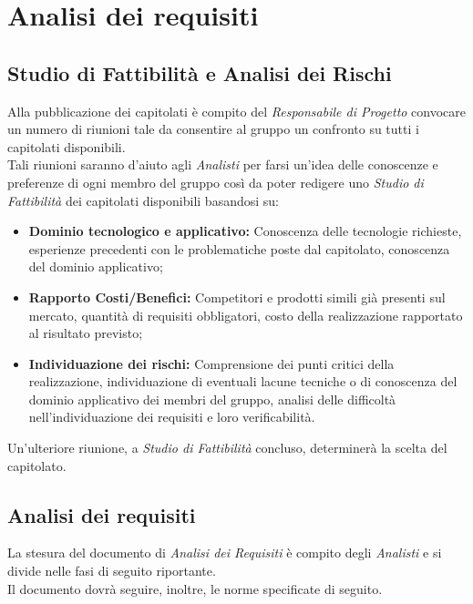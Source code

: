 \section{Analisi dei requisiti}
  \subsection{Studio di Fattibilità e Analisi dei Rischi}
    Alla pubblicazione dei capitolati è compito del \emph{Responsabile di Progetto} convocare un numero di riunioni tale da consentire
    al gruppo un confronto su tutti i capitolati disponibili.\\
    Tali riunioni saranno d'aiuto agli \emph{Analisti} per farsi un'idea delle conoscenze e preferenze di ogni membro del gruppo così da
    poter redigere uno \emph{Studio di Fattibilità} dei capitolati disponibili basandosi su:\\
    \begin{itemize}
      \item \textbf{Dominio tecnologico e applicativo: }Conoscenza delle tecnologie richieste, esperienze precedenti con le problematiche poste dal capitolato, conoscenza del
      dominio applicativo;
      \item \textbf{Rapporto Costi/Benefici: }Competitori e prodotti simili già presenti sul mercato, quantità di requisiti obbligatori, costo della realizzazione rapportato al
      risultato previsto;
      \item \textbf{Individuazione dei rischi: }Comprensione dei punti critici della realizzazione, individuazione di eventuali lacune tecniche o di conoscenza del dominio applicativo
      dei membri del gruppo, analisi delle difficoltà nell’individuazione dei requisiti e loro verificabilità.
    \end{itemize}
    Un'ulteriore riunione, a \emph{Studio di Fattibilità} concluso, determinerà la scelta del capitolato.
  \subsection{Analisi dei requisiti}
    La stesura del documento di \emph{Analisi dei Requisiti} è compito degli \emph{Analisti} e si divide nelle fasi di seguito riportante.\\
    Il documento dovrà seguire, inoltre, le norme specificate di seguito.
